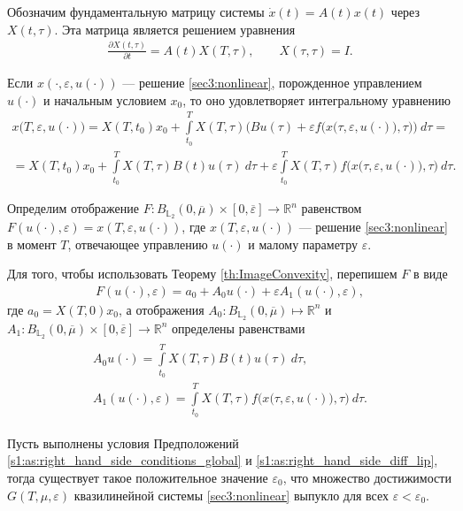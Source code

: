 \documentclass[../main.tex]{subfiles}
\begin{document}
Обозначим фундаментальную матрицу системы $\dot{x}(t) = A(t) x(t)$ через $X(t,\tau)$.
Эта матрица является решением уравнения
\begin{gather*}
	\frac{\partial X(t,\tau)}{\partial t} = A(t) X(T,\tau), \qquad X(\tau,\tau) = I.
\end{gather*}

Если $x(\cdot,\varepsilon, u(\cdot))$ --- решение \eqref{sec3:nonlinear}, порожденное управлением $u(\cdot)$ и начальным условием $x_0$, то оно удовлетворяет интегральному уравнению
\begin{gather*}
	x\big(T,\varepsilon, u(\cdot)\big) =
	X(T,t_0)x_0 + 
	\int\limits_{t_0}^T X(T,\tau) \bigg(Bu(\tau) +
	\varepsilon f\Big(x\big(\tau,\varepsilon, u(\cdot)\big),\tau\Big) \bigg)\ d\tau = \\ =
	X(T,t_0)x_0 +
	\int\limits_{t_0}^T X(T,\tau) B(t)u(\tau)\ d\tau 
	+ \varepsilon \int\limits_{t_0}^T X(T,\tau) f\Big(x\big(\tau,\varepsilon, u(\cdot)\big),\tau\Big) \ d\tau.
\end{gather*}

Определим отображение $F:B_{\mathbb{L}_2}(0,\overline{\mu})\times [0,\overline{\varepsilon}] \to \mathbb{R}^n$ равенством $F(u(\cdot),\varepsilon) = x(T,\varepsilon,u(\cdot))$, где $x(T,\varepsilon,u(\cdot))$ --- решение \eqref{sec3:nonlinear} в момент $T$, отвечающее управлению $u(\cdot)$ и малому параметру $\varepsilon$.

Для того, чтобы использовать Теорему \ref{th:ImageConvexity}, перепишем $F$ в виде
\begin{gather*}
	F(u(\cdot),\varepsilon) = a_0 + A_0 u(\cdot) + \varepsilon A_1(u(\cdot), \varepsilon), 
\end{gather*}
где $a_0 = X(T,0)x_0 $, а отображения $A_0: B_{\mathbb{L}_2}(0,\overline{\mu}) \mapsto \mathbb{R}^n$ и $A_1: B_{\mathbb{L}_2}(0,\overline{\mu}) \times [0,\overline{\varepsilon}] \to \mathbb{R}^n$ определены равенствами
\begin{gather}\label{A1_def}
	\begin{gathered}
	A_0 u(\cdot) = \int\limits_{t_0}^T X(T,\tau) B(t)u(\tau)\ d\tau, \\
	A_1(u(\cdot),\varepsilon) = \int\limits_{t_0}^T X(T,\tau) f\Big(x\big(\tau,\varepsilon, u(\cdot)\big),\tau\Big) \ d\tau.
	\end{gathered}
\end{gather}




\begin{theorem}\label{th:ReachableSetsConvexity}
	Пусть выполнены условия Предположений \ref{s1:as:right_hand_side_conditions_global} и \ref{s1:as:right_hand_side_diff_lip}, тогда существует такое положительное значение $\varepsilon_0$, что множество достижимости $G(T,\mu,\varepsilon) $ квазилинейной системы \eqref{sec3:nonlinear} выпукло для всех $\varepsilon < \varepsilon_0$. 
\end{theorem}
\end{document}
